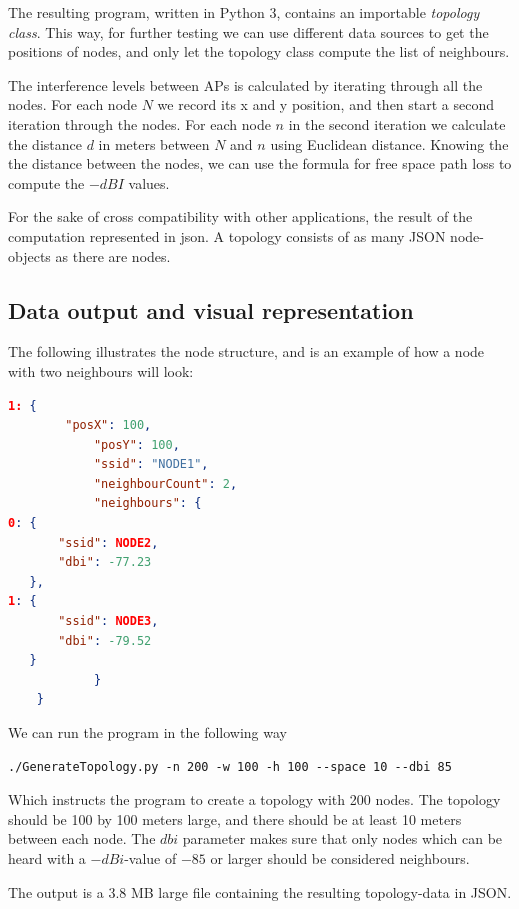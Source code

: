 	The resulting program, written in Python 3\cite{Python3}, contains an importable \textit{topology class}. This way, for further testing we can use different data sources to get the positions of nodes,
	and only let the topology class compute the list of neighbours. 

	The interference levels between APs is calculated by iterating through all the nodes. For each node $N$ we record its x and y position,
	and then start a second iteration through the nodes. For each node $n$ in the second iteration we calculate the distance $d$ in
	meters between $N$ and $n$ using Euclidean distance. Knowing the the distance between the nodes,  we can use the formula for free space path loss \cite{FSPL} to compute the $-dBI$ values.

	For the sake of cross compatibility with other applications, the result of the computation represented in json. A topology consists of as
	many JSON node-objects as there are nodes.


	\subsection{Data output and visual representation} \label{simulationrep}
	The following illustrates the node structure, and is an example of how a node with two neighbours will look: 

	\begin{minipage}{\linewidth}
	\begin{lstlisting}[language=json]
	1: {
		"posX": 100,
			"posY": 100, 
			"ssid": "NODE1",
			"neighbourCount": 2, 
			"neighbours": {
0: {
	   "ssid": NODE2,
	   "dbi": -77.23
   },
1: {
	   "ssid": NODE3,
	   "dbi": -79.52
   }
			}
	}
\end{lstlisting}
\end{minipage}

We can run the program in the following way
\begin{verbatim}./GenerateTopology.py -n 200 -w 100 -h 100 --space 10 --dbi 85 \end{verbatim}
Which instructs the program to create a topology with 200 nodes. 
The topology should be 100 by 100 meters large, and there should be at least 10 meters
between each node. The $dbi$ parameter makes sure that only nodes which can be
heard with a $-dBi$-value of $-85$ or larger should be considered neighbours.

The output is a 3.8 MB large file containing the resulting topology-data in JSON.

